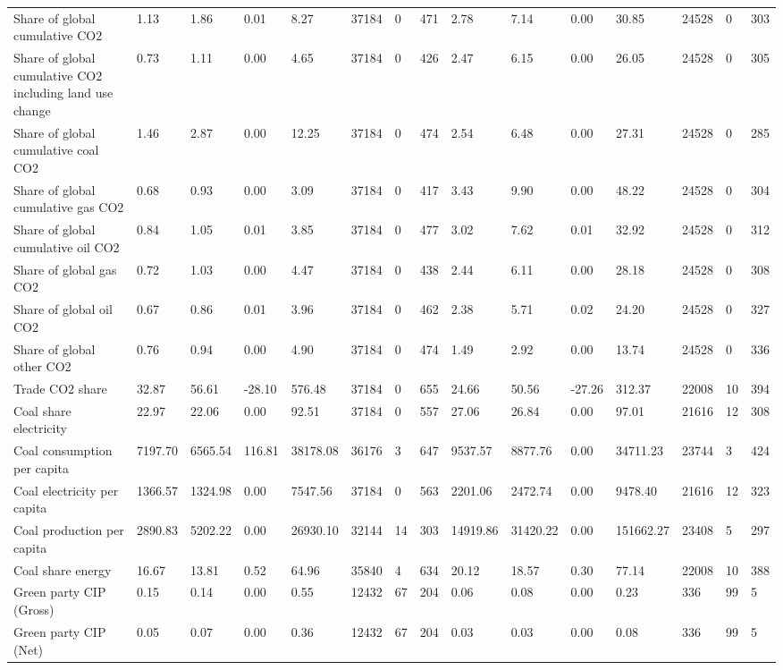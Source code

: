 \begin{longtable}{lllllllllllllll}
\addlinespace
Share of global cumulative CO2 & 1.13 & 1.86 & 0.01 & 8.27 & 37184 & 0 & 471 & 2.78 & 7.14 & 0.00 & 30.85 & 24528 & 0 & 303\\
Share of global cumulative CO2 including land use change & 0.73 & 1.11 & 0.00 & 4.65 & 37184 & 0 & 426 & 2.47 & 6.15 & 0.00 & 26.05 & 24528 & 0 & 305\\
Share of global cumulative coal CO2 & 1.46 & 2.87 & 0.00 & 12.25 & 37184 & 0 & 474 & 2.54 & 6.48 & 0.00 & 27.31 & 24528 & 0 & 285\\
Share of global cumulative gas CO2 & 0.68 & 0.93 & 0.00 & 3.09 & 37184 & 0 & 417 & 3.43 & 9.90 & 0.00 & 48.22 & 24528 & 0 & 304\\
Share of global cumulative oil CO2 & 0.84 & 1.05 & 0.01 & 3.85 & 37184 & 0 & 477 & 3.02 & 7.62 & 0.01 & 32.92 & 24528 & 0 & 312\\
\addlinespace
Share of global gas CO2 & 0.72 & 1.03 & 0.00 & 4.47 & 37184 & 0 & 438 & 2.44 & 6.11 & 0.00 & 28.18 & 24528 & 0 & 308\\
Share of global oil CO2 & 0.67 & 0.86 & 0.01 & 3.96 & 37184 & 0 & 462 & 2.38 & 5.71 & 0.02 & 24.20 & 24528 & 0 & 327\\
Share of global other CO2 & 0.76 & 0.94 & 0.00 & 4.90 & 37184 & 0 & 474 & 1.49 & 2.92 & 0.00 & 13.74 & 24528 & 0 & 336\\
Trade CO2 share & 32.87 & 56.61 & -28.10 & 576.48 & 37184 & 0 & 655 & 24.66 & 50.56 & -27.26 & 312.37 & 22008 & 10 & 394\\
Coal share electricity & 22.97 & 22.06 & 0.00 & 92.51 & 37184 & 0 & 557 & 27.06 & 26.84 & 0.00 & 97.01 & 21616 & 12 & 308\\
\addlinespace
Coal consumption per capita & 7197.70 & 6565.54 & 116.81 & 38178.08 & 36176 & 3 & 647 & 9537.57 & 8877.76 & 0.00 & 34711.23 & 23744 & 3 & 424\\
Coal electricity per capita & 1366.57 & 1324.98 & 0.00 & 7547.56 & 37184 & 0 & 563 & 2201.06 & 2472.74 & 0.00 & 9478.40 & 21616 & 12 & 323\\
Coal production per capita & 2890.83 & 5202.22 & 0.00 & 26930.10 & 32144 & 14 & 303 & 14919.86 & 31420.22 & 0.00 & 151662.27 & 23408 & 5 & 297\\
Coal share energy & 16.67 & 13.81 & 0.52 & 64.96 & 35840 & 4 & 634 & 20.12 & 18.57 & 0.30 & 77.14 & 22008 & 10 & 388\\
Green party CIP (Gross) & 0.15 & 0.14 & 0.00 & 0.55 & 12432 & 67 & 204 & 0.06 & 0.08 & 0.00 & 0.23 & 336 & 99 & 5\\
\addlinespace
Green party CIP (Net) & 0.05 & 0.07 & 0.00 & 0.36 & 12432 & 67 & 204 & 0.03 & 0.03 & 0.00 & 0.08 & 336 & 99 & 5\\

\end{longtable}

